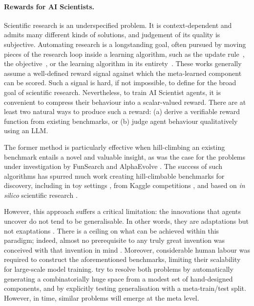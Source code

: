 \documentclass[garamond,a4paper]{inherent}
\begin{document}
\paragraph{Rewards for AI Scientists.}
Scientific research is an underspecified problem.
It is context-dependent and admits many different kinds of solutions, and judgement of its quality is subjective.
Automating research is a longstanding goal, often pursued by moving pieces of the research loop inside a learning algorithm, such as the update rule~\citep{schmidhuber1987evolutionary,bengio1992optimization}, the objective~\citep{kirsch2019improving,oh2020discovering}, or the learning algorithm in its entirety~\citep{real2020automl,kirsch2022general}.
These works generally assume a well-defined reward signal against which the meta-learned component can be scored.
Such a signal is hard, if not impossible, to define for the broad goal of scientific research.
Nevertheless, to train AI Scientist agents, it is convenient to compress their behaviour into a scalar-valued reward. 
There are at least two natural ways to produce such a reward: (a) derive a verifiable reward function from existing benchmarks, or (b) judge agent behaviour qualitatively using an LLM. 

The former method is particularly effective when hill-climbing an existing benchmark entails a novel and valuable insight, as was the case for the problems under investigation by FunSearch \citep{funsearch} and AlphaEvolve \citep{alphaevolve}.
The success of such algorithms has spurred much work creating hill-climbable benchmarks for discovery, including in toy settings \citep{discoverybench}, from Kaggle competitions \citep{mle-bench,mledojo}, and based on \textit{in silico} scientific research \citep{mlagentbench,scienceagentbench,mlgym, re-bench,automated-llm-speedrunner,posttrainbench,airsbench}. 

However, this approach suffers a critical limitation: the innovations that agents uncover do not tend to be generalisable.
In other words, they are adaptations but not exaptations \citep{gould1982exaptation}.
There is a ceiling on what can be achieved within this paradigm; indeed, almost no prerequisite to any truly great invention was conceived with that invention in mind \citep{secretan2008picbreeder,stanley2015greatness}. Moreover, considerable human labour was required to construct the aforementioned benchmarks, limiting their scalability for large-scale model training.
\cite{goldie2026procedural} try to resolve both problems by automatically generating a combinatorially huge space from a modest set of hand-designed components, and by explicitly testing generalisation with a meta-train/test split. However, in time, similar problems will emerge at the meta level.
\end{document}
